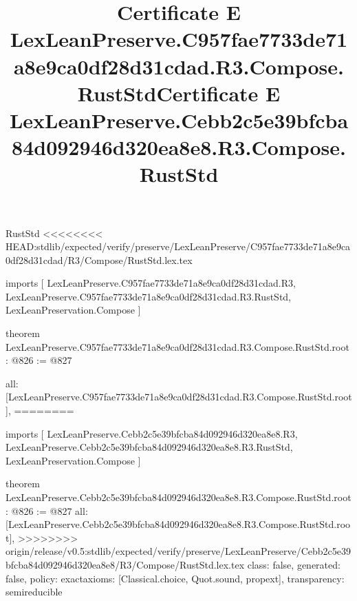 \begin{lexlean}{RustStd}
<<<<<<<< HEAD:stdlib/expected/verify/preserve/LexLeanPreserve/C957fae7733de71a8e9ca0df28d31cdad/R3/Compose/RustStd.lex.tex
\title{Certificate E LexLeanPreserve.C957fae7733de71a8e9ca0df28d31cdad.R3.Compose.RustStd}
\begin{coremodule}
imports [
  LexLeanPreserve.C957fae7733de71a8e9ca0df28d31cdad.R3,
  LexLeanPreserve.C957fae7733de71a8e9ca0df28d31cdad.R3.RustStd,
  LexLeanPreservation.Compose
]

theorem LexLeanPreserve.C957fae7733de71a8e9ca0df28d31cdad.R3.Compose.RustStd.root : @826 := @827 {
  all: [LexLeanPreserve.C957fae7733de71a8e9ca0df28d31cdad.R3.Compose.RustStd.root],
========
\title{Certificate E LexLeanPreserve.Cebb2c5e39bfcba84d092946d320ea8e8.R3.Compose.RustStd}
\begin{coremodule}
imports [
  LexLeanPreserve.Cebb2c5e39bfcba84d092946d320ea8e8.R3,
  LexLeanPreserve.Cebb2c5e39bfcba84d092946d320ea8e8.R3.RustStd,
  LexLeanPreservation.Compose
]

theorem LexLeanPreserve.Cebb2c5e39bfcba84d092946d320ea8e8.R3.Compose.RustStd.root : @826 := @827 {
  all: [LexLeanPreserve.Cebb2c5e39bfcba84d092946d320ea8e8.R3.Compose.RustStd.root],
>>>>>>>> origin/release/v0.5:stdlib/expected/verify/preserve/LexLeanPreserve/Cebb2c5e39bfcba84d092946d320ea8e8/R3/Compose/RustStd.lex.tex
  class: false,
  generated: false,
  policy: exact{axioms: [Classical.choice, Quot.sound, propext]},
  transparency: semireducible
}


\end{coremodule}}
\end{coremodule}
\end{lexlean}
